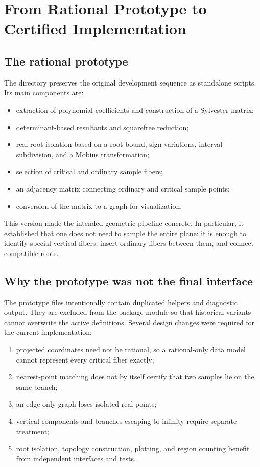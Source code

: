 \documentclass[11pt,a4paper]{article}
\newcommand{\file}[1]{\begingroup\urlstyle{tt}\path{#1}\endgroup}
\begin{document}
\section{From Rational Prototype to Certified Implementation}

\subsection{The rational prototype}

The directory \file{prototype/rational_method/} preserves the original
development sequence as standalone scripts. Its main components are:
\begin{itemize}
  \item extraction of polynomial coefficients and construction of a Sylvester
        matrix;
  \item determinant-based resultants and squarefree reduction;
  \item real-root isolation based on a root bound, sign variations, interval
        subdivision, and a Mobius transformation;
  \item selection of critical and ordinary sample fibers;
  \item an adjacency matrix connecting ordinary and critical sample points;
  \item conversion of the matrix to a graph for visualization.
\end{itemize}

This version made the intended geometric pipeline concrete. In particular,
it established that one does not need to sample the entire plane: it is enough
to identify special vertical fibers, insert ordinary fibers between them, and
connect compatible roots.

\subsection{Why the prototype was not the final interface}

The prototype files intentionally contain duplicated helpers and diagnostic
output. They are excluded from the package module so that historical variants
cannot overwrite the active definitions. Several design changes were required
for the current implementation:
\begin{enumerate}
  \item projected coordinates need not be rational, so a rational-only data
        model cannot represent every critical fiber exactly;
  \item nearest-point matching does not by itself certify that two samples
        lie on the same branch;
  \item an edge-only graph loses isolated real points;
  \item vertical components and branches escaping to infinity require
        separate treatment;
  \item root isolation, topology construction, plotting, and region counting
        benefit from independent interfaces and tests.
\end{enumerate}
\end{document}
